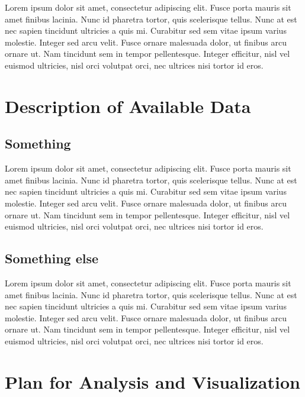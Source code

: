 \documentclass{article}
\begin{document}
Lorem ipsum dolor sit amet, consectetur adipiscing elit. Fusce porta
mauris sit amet finibus lacinia. Nunc id pharetra tortor, quis
scelerisque tellus. Nunc at est nec sapien tincidunt ultricies a quis
mi. Curabitur sed sem vitae ipsum varius molestie. Integer sed arcu
velit. Fusce ornare malesuada dolor, ut finibus arcu ornare ut. Nam
tincidunt sem in tempor pellentesque. Integer efficitur, nisl vel
euismod ultricies, nisl orci volutpat orci, nec ultrices nisi tortor id
eros.

\section{Description of Available
Data}\label{description-of-available-data}

\subsection{Something}\label{something-1}

Lorem ipsum dolor sit amet, consectetur adipiscing elit. Fusce porta
mauris sit amet finibus lacinia. Nunc id pharetra tortor, quis
scelerisque tellus. Nunc at est nec sapien tincidunt ultricies a quis
mi. Curabitur sed sem vitae ipsum varius molestie. Integer sed arcu
velit. Fusce ornare malesuada dolor, ut finibus arcu ornare ut. Nam
tincidunt sem in tempor pellentesque. Integer efficitur, nisl vel
euismod ultricies, nisl orci volutpat orci, nec ultrices nisi tortor id
eros.

\subsection{Something else}\label{something-else-1}

Lorem ipsum dolor sit amet, consectetur adipiscing elit. Fusce porta
mauris sit amet finibus lacinia. Nunc id pharetra tortor, quis
scelerisque tellus. Nunc at est nec sapien tincidunt ultricies a quis
mi. Curabitur sed sem vitae ipsum varius molestie. Integer sed arcu
velit. Fusce ornare malesuada dolor, ut finibus arcu ornare ut. Nam
tincidunt sem in tempor pellentesque. Integer efficitur, nisl vel
euismod ultricies, nisl orci volutpat orci, nec ultrices nisi tortor id
eros.

\section{Plan for Analysis and
Visualization}\label{plan-for-analysis-and-visualization}
\end{document}
